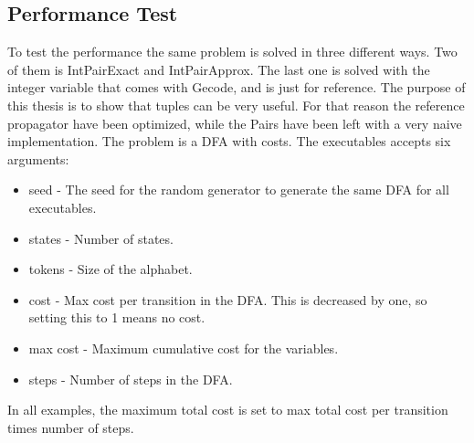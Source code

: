 \documentclass[a4paper,11pt]{article}
\begin{document}
\subsection{Performance Test}
To test the performance the same problem is solved in three different ways. Two of them is IntPairExact and IntPairApprox. The last one is solved with the integer variable that comes with Gecode, and is just for reference. The purpose of this thesis is to show that tuples can be very useful. For that reason the reference propagator have been optimized, while the Pairs have been left with a very naive implementation. The problem is a DFA with costs. The executables accepts six arguments: 
\begin{itemize}
\item{seed} - The seed for the random generator to generate the same DFA for all executables.
\item{states} - Number of states.
\item{tokens} - Size of the alphabet.
\item{cost} - Max cost per transition in the DFA. This is decreased by one, so setting this to 1 means no cost.
\item{max cost} - Maximum cumulative cost for the variables.
\item{steps} - Number of steps in the DFA.
\end{itemize}
In all examples, the maximum total cost is set to max total cost per transition times number of steps.
\end{document}
